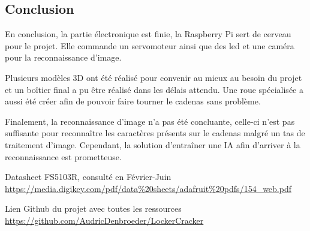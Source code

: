 \documentclass[twoside]{article}
\begin{document}
\begin{multicols}{2}
\section{Conclusion}

En conclusion, la partie électronique est finie, la Raspberry Pi sert de cerveau pour le projet. Elle commande un servomoteur ainsi que des led et une caméra pour la reconnaissance d'image.

Plusieurs modèles 3D ont été réalisé pour convenir au mieux au besoin du projet et un boîtier final a pu être réalisé dans les délais attendu. Une roue spécialisée a aussi été créer afin de pouvoir faire tourner le cadenas sans problème.

Finalement, la reconnaissance d'image n'a pas été concluante, celle-ci n'est pas suffisante pour reconnaître les caractères présents sur le cadenas malgré un tas de traitement d'image. Cependant, la solution d'entraîner une IA afin d'arriver à la reconnaissance est prometteuse.

\begin{thebibliography}{99} %

Datasheet FS5103R, consulté en Février-Juin
\\{ \url{https://media.digikey.com/pdf/data\%20sheets/adafruit\%20pdfs/154_web.pdf}}

Lien Github du projet avec toutes les ressources
\\{ \url{https://github.com/AudricDenbroeder/LockerCracker}}
 
\end{thebibliography}


\end{multicols}
\end{document}
